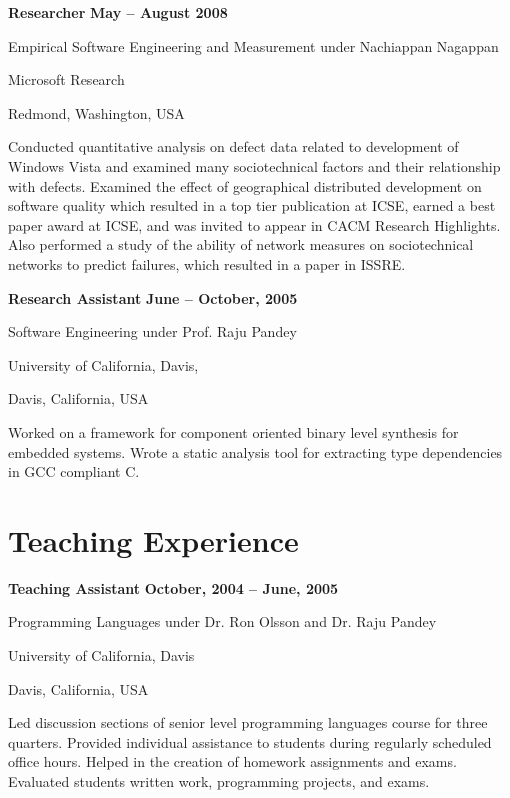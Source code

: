 \documentclass[margin,line,article]{res}
\newenvironment{list1}{
  \begin{list}{}{%
      \setlength{\itemsep}{0in}
      \setlength{\parsep}{0in} \setlength{\parskip}{0in}
      \setlength{\topsep}{0in} \setlength{\partopsep}{0in} 
      \setlength{\leftmargin}{0.17in}}}{\end{list}}
\begin{document}
\begin{resume}
\textbf{Researcher} \hfill \textbf{May -- August 2008}\\
\vspace{-10pt}
\begin{list1}
\item Empirical Software Engineering and Measurement under Nachiappan Nagappan
\item Microsoft Research
\item Redmond, Washington, USA
\vspace{6pt}
\item Conducted quantitative analysis on defect data related to development of Windows 
Vista and examined many sociotechnical factors and their relationship with defects. 
Examined the effect of geographical distributed development on software quality which 
resulted in a top tier publication at ICSE, earned a best paper award at ICSE,
and was invited to appear in CACM Research Highlights.  Also performed a study
of the ability of network measures on sociotechnical networks to predict failures,
which resulted in a paper in ISSRE.
\end{list1}

\textbf{Research Assistant} \hfill \textbf{June -- October, 2005}\\
\vspace{-10pt}
\begin{list1}
\item Software Engineering under Prof. Raju Pandey
\item University of California, Davis,
\item Davis, California, USA
\vspace{6pt}
\item Worked on a framework for component oriented binary level synthesis for embedded 
systems. Wrote a static analysis tool for extracting type dependencies in GCC compliant 
C. 
\end{list1}

\section{Teaching Experience}
\textbf{Teaching Assistant} \hfill \textbf{October, 2004 -- June, 2005}\\
\vspace{-10pt}
\begin{list1}
\item Programming Languages under Dr. Ron Olsson and Dr. Raju Pandey
\item University of California, Davis
\item Davis, California, USA
\vspace{6pt}
\item Led discussion sections of senior level programming languages course for three quarters.
Provided individual assistance to students during regularly scheduled office hours. 
Helped in the creation of homework assignments and exams. Evaluated students written 
work, programming projects, and exams. 
\end{list1}


\end{resume}
\end{document}
